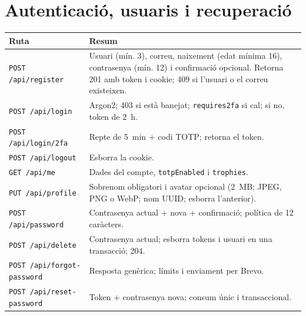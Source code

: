 \documentclass[10pt,a4paper]{article}
\begin{document}
\section{Autenticació, usuaris i recuperació}

\begin{table}[ht]
\small
\begin{tabularx}{\textwidth}{@{}p{5.2cm}X@{}}
\toprule
\textbf{Ruta} & \textbf{Resum} \\
\midrule
\texttt{POST /api/register} & Usuari (mín. 3), correu, naixement (edat mínima 16),
contrasenya (mín. 12) i confirmació opcional. Retorna 201 amb token i cookie; 409 si
l'usuari o el correu existeixen. \\
\texttt{POST /api/login} & Argon2; 403 si està banejat; \texttt{requires2fa} si cal;
si no, token de 2~h. \\
\texttt{POST /api/login/2fa} & Repte de 5~min + codi TOTP; retorna el token. \\
\texttt{POST /api/logout} & Esborra la cookie. \\
\texttt{GET /api/me} & Dades del compte, \texttt{totpEnabled} i
\texttt{trophies}. \\
\texttt{PUT /api/profile} & Sobrenom obligatori i avatar opcional (2~MB; JPEG, PNG o
WebP; nom UUID; esborra l'anterior). \\
\texttt{POST /api/password} & Contrasenya actual + nova + confirmació; política de 12
caràcters. \\
\texttt{POST /api/delete} & Contrasenya actual; esborra tokens i usuari en una
transacció; 204. \\
\texttt{POST /api/forgot-password} & Resposta genèrica; límits i enviament per Brevo. \\
\texttt{POST /api/reset-password} & Token + contrasenya nova; consum únic i
transaccional. \\
\bottomrule
\end{tabularx}
\end{table}
\end{document}
